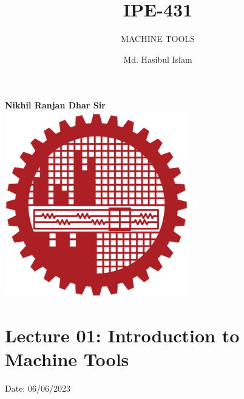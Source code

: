 \documentclass{article}
\title{IPE-431}
\author{Md. Hasibul Islam}
\subtitle{MACHINE TOOLS}
\begin{document}
\begin{titlepage}
    \centering
    
    {\Huge\bfseries\maketitle}
    \textbf{Nikhil Ranjan Dhar Sir} \\
    \vspace{2cm}
    \includegraphics[width=8cm]{institution_logo.jpg}
    \vfill
    \vspace*{2cm}
\end{titlepage}

\tableofcontents
\pagebreak
\section{Lecture 01: Introduction to Machine Tools} 
\hfill Date: 06/06/2023
\end{document}
